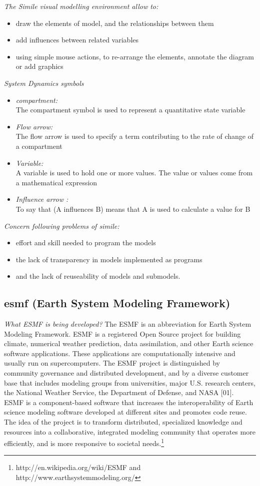\emph{The Simile visual modelling environment allow to:}
\begin{itemize}
	\item draw the elements of model, and the relationships between them
	\item add influences between related variables
	\item using simple mouse actions, to re-arrange the elements, annotate the diagram or add graphics
\end{itemize}	
	
\emph{System Dynamics symbols}
\begin{itemize}
	\item \emph{compartment:}\\
The compartment symbol is used to represent a quantitative state variable
	\item \emph{Flow arrow:}\\
The flow arrow is used to specify a term contributing to the rate of change of a compartment
	\item \emph{Variable:}\\
A variable is used to hold one or more values. The value or values come from a mathematical expression
	\item \emph{Influence arrow :}\\
To say that (A influences B) means that A is used to calculate a value for B
\end{itemize}	

\emph{Concern following problems of simile:}
\begin{itemize}
	\item effort and skill needed to program the models
	\item the lack of transparency in models implemented as programs
	\item and the lack of reuseability of models and submodels.
\end{itemize}	
	
\subsection{esmf (Earth System Modeling Framework)}
\emph{What ESMF is being developed?}
The ESMF is an abbreviation for Earth System Modeling Framework. ESMF is a registered Open Source project for building climate, numerical weather prediction, data assimilation, and other Earth science software applications. These applications are computationally intensive and usually run on supercomputers. The ESMF project is distinguished by community governance and distributed development, and by a diverse customer base that includes modeling groups from universities, major U.S. research centers, the National Weather Service, the Department of Defense, and NASA [01].\\
ESMF is a component-based software that increases the interoperability of Earth science modeling software developed at different sites and promotes code reuse. The idea of the project is to transform distributed, specialized knowledge and resources into a collaborative, integrated modeling community that operates more efficiently, and is more responsive to societal needs.\footnote{http://en.wikipedia.org/wiki/ESMF and http://www.earthsystemmodeling.org/}

